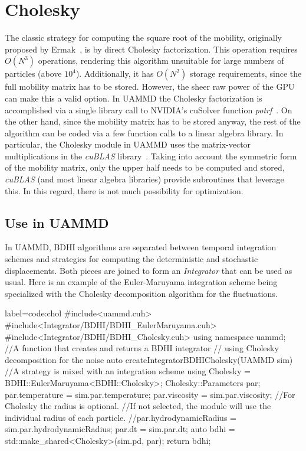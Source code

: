 \documentclass[ twoside,openright,titlepage,numbers=noenddot,%
headinclude,footinclude,cleardoublepage=empty,abstract=on,
BCOR=5mm,paper=b5,fontsize=11pt, dvipsnames
]{scrreprt}
\newcommand{\uammd}{\gls{UAMMD}\xspace}
\newcommand{\gpu}{\gls{GPU}\xspace}
\begin{document}
\section{Cholesky}\label{sec:chol}
The classic strategy for computing the square root of the mobility, originally proposed by Ermak~\cite{Ermak1978}, is by direct Cholesky factorization. This operation requires $O(N^3)$ operations, rendering this algorithm unsuitable for large numbers of particles (above $10^4$). Additionally, it has $O(N^2)$ storage requirements, since the full mobility matrix has to be stored.
However, the sheer raw power of the \gpu can make this a valid option. In \uammd the Cholesky factorization is accomplished via a single library call to NVIDIA's cuSolver function \emph{potrf}~\cite{cusolver}.
On the other hand, since the mobility matrix has to be stored anyway, the rest of the algorithm can be coded via a few function calls to a linear algebra library. In particular, the Cholesky module in \uammd uses the matrix-vector multiplications in the \emph{cuBLAS} library~\cite{cublas}. Taking into account the symmetric form of the mobility matrix, only the upper half needs to be computed and stored, \emph{cuBLAS} (and most linear algebra libraries) provide subroutines that leverage this. In this regard, there is not much possibility for optimization.

\subsection*{Use in UAMMD}\label{sec:uammdchol}
In \uammd, \gls{BDHI} algorithms are separated between temporal integration schemes and strategies for computing the deterministic and stochastic displacements. Both pieces are joined to form an \emph{Integrator} that can be used as usual.
Here is an example of the Euler-Maruyama integration scheme being specialized with the Cholesky decomposition algorithm for the fluctuations.
\begin{code2}{label=code:chol}
#include<uammd.cuh>
#include<Integrator/BDHI/BDHI_EulerMaruyama.cuh>
#include<Integrator/BDHI/BDHI_Cholesky.cuh>
using namespace uammd;
//A function that creates and returns a BDHI integrator
// using Cholesky decomposition for the noise
auto createIntegratorBDHICholesky(UAMMD sim){   
  //A strategy is mixed with an integration scheme
  using Cholesky = BDHI::EulerMaruyama<BDHI::Cholesky>;
  Cholesky::Parameters par;
  par.temperature = sim.par.temperature;
  par.viscosity = sim.par.viscosity;
  //For Cholesky the radius is optional.
  //If not selected, the module will use the individual radius of each particle.
  //par.hydrodynamicRadius = sim.par.hydrodynamicRadius;
  par.dt = sim.par.dt;
  auto bdhi = std::make_shared<Cholesky>(sim.pd, par);
  return bdhi;
}
\end{code2}
\end{document}
